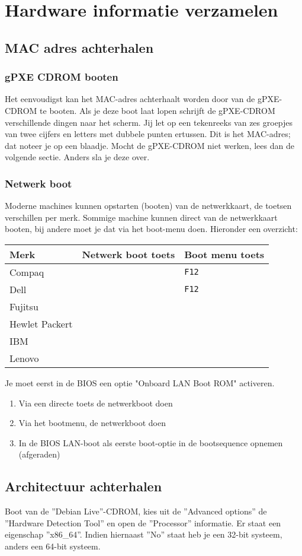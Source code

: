 \section{Hardware informatie verzamelen}
\subsection{MAC adres achterhalen}
\subsubsection{gPXE CDROM booten}
Het eenvoudigst kan het MAC-adres achterhaalt worden door van de gPXE-CDROM te booten. Als je deze boot laat lopen schrijft de gPXE-CDROM verschillende dingen naar het scherm. Jij let op een tekenreeks van zes groepjes van twee cijfers en letters met dubbele punten ertussen. Dit is het MAC-adres; dat noteer je op een blaadje. Mocht de gPXE-CDROM niet werken, lees dan de volgende sectie. Anders sla je deze over.
\subsubsection{Netwerk boot}
Moderne machines kunnen opstarten (booten) van de netwerkkaart, de toetsen verschillen per merk. Sommige machine kunnen direct van de netwerkkaart booten, bij andere moet je dat via het boot-menu doen. Hieronder een overzicht:
\begin{table}[H]
	\begin{tabular}{| l | l |  l |}
	\hline 
	\textbf{Merk} & \textbf{Netwerk boot toets} & \textbf{Boot menu toets}\\
	\hline
	Compaq &  & \texttt{F12}\\
	\hline
	Dell &  & \texttt{F12} \\
	\hline
	Fujitsu &  & \\
	\hline
	Hewlet Packert &   & \\
	\hline
	IBM &   & \\
	\hline
	Lenovo &  &  \\
	\hline
\end{tabular}
\end{table}
Je moet eerst in de BIOS een optie "Onboard LAN Boot ROM" activeren.
\begin{enumerate}
	\item{Via een directe toets de netwerkboot doen}
	\item{Via het bootmenu, de netwerkboot doen}
	\item{In de BIOS LAN-boot als eerste boot-optie in de bootsequence opnemen (afgeraden)}
\end{enumerate}
\subsection{Architectuur achterhalen}
Boot van de ''Debian Live''-CDROM, kies uit de ''Advanced options'' de ''Hardware Detection Tool'' en open de ''Processor'' informatie.
Er staat een eigenschap ''x86\_64''. Indien hiernaast ''No'' staat heb je een 32-bit systeem, anders een 64-bit systeem.
